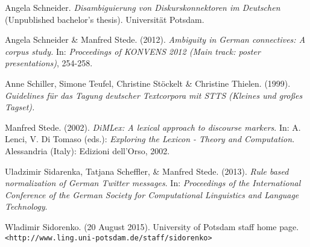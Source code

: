 \documentclass[11pt]{article}
\def\mono#1{\texttt{#1}}  %
\begin{document}
\begin{thebibliography}{} 

 Angela Schneider.  \emph{Disambiguierung von Diskurskonnektoren im Deutschen} (Unpublished bachelor's thesis). Universit{\"a}t Potsdam.

 Angela Schneider \& Manfred Stede.  (2012). \emph{Ambiguity in German connectives: A corpus study.}  In: \emph{Proceedings of KONVENS 2012 (Main track: poster presentations)}, 254-258.

 Anne Schiller, Simone Teufel, Christine St{\"o}ckelt \& Christine Thielen. (1999).  \emph{Guidelines f{\"u}r das Tagung deutscher Textcorpora mit STTS (Kleines und gro{\ss}es Tagset).}

Manfred Stede. (2002). \emph{DiMLex: A lexical approach to discourse markers}. In: A. Lenci, V. Di Tomaso (eds.): \emph{Exploring the Lexicon - Theory and Computation}. Alessandria (Italy): Edizioni dell'Orso, 2002.

 Uladzimir Sidarenka, Tatjana Scheffler, \& Manfred Stede.  (2013).  \emph{Rule based normalization of German Twitter messages}. In: \emph{Proceedings of the International Conference of the German Society for Computational Linguistics and Language Technology}.

 Wladimir Sidorenko.  (20 August 2015).  University of Potsdam staff home page.  \mono{<http://www.ling.uni-potsdam.de/staff/sidorenko>}

\end{thebibliography}
\end{document}
